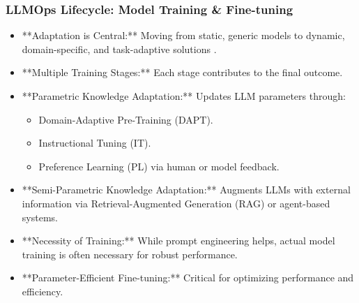 \documentclass{beamer}       %
\begin{document}
\begin{frame}
    \frametitle{LLMOps Lifecycle: Model Training \& Fine-tuning}
    \tiny
    \begin{itemize}
        \item **Adaptation is Central:** Moving from static, generic models to dynamic, domain-specific, and task-adaptive solutions .
        \item **Multiple Training Stages:** Each stage contributes to the final outcome.
        \item **Parametric Knowledge Adaptation:** Updates LLM parameters through:
        \begin{itemize}
        \tiny
            \item Domain-Adaptive Pre-Training (DAPT).
            \item Instructional Tuning (IT).
            \item Preference Learning (PL) via human or model feedback.
        \end{itemize}
        \item **Semi-Parametric Knowledge Adaptation:** Augments LLMs with external information via Retrieval-Augmented Generation (RAG) or agent-based systems.
        \item **Necessity of Training:** While prompt engineering helps, actual model training is often necessary for robust performance.
        \item **Parameter-Efficient Fine-tuning:** Critical for optimizing performance and efficiency.
    \end{itemize}
\end{frame}
\end{document}
